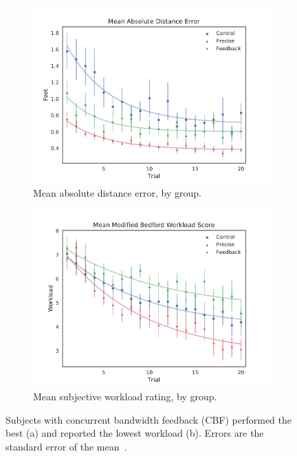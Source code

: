 \begin{figure}[tb!]
    \begin{center}
        \begin{subfigure}{0.49\textwidth}
            \includegraphics[width=\linewidth]{figures/AR/Group_absDistErr_clean_fit_30.png}
            \caption[Mean absolute distance error]{Mean absolute distance error, by group.}
            \label{figure:saferdistance}
        \end{subfigure}\hfill
        \begin{subfigure}{0.49\textwidth}
            \includegraphics[width=\linewidth]{figures/AR/Group_Workload_fit_30.png}
            \caption[Mean subjective workload rating]{Mean subjective workload rating, by group.}
            \label{figure:saferworkload}
        \end{subfigure}
        \caption[Performance and workload benefits from feedback]{Subjects with concurrent bandwidth feedback (CBF) performed the best (a) and reported the lowest workload (b). Errors are the standard error of the mean~\citep{karasinski_real-time_2016}.}
    \end{center}
\end{figure}

